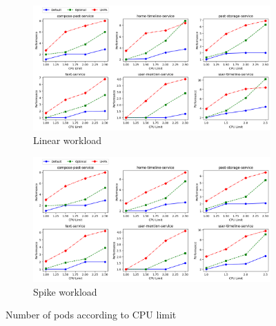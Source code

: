 \documentclass[conference]{IEEEtran}
\begin{document}
\begin{figure}[tb]
    \begin{subfigure}{.48\textwidth}
        \centering
        \includegraphics[width=1\linewidth]{images/evaluation/linear_result.png}
        \caption{Linear workload}
        \label{fig:num of pods linear}
    \end{subfigure}
    \begin{subfigure}{.48\textwidth}
        \centering
        \includegraphics[width=1\linewidth]{images/evaluation/spike_result.png}
        \caption{Spike workload}
        \label{fig:num of pods spike}
    \end{subfigure}

    \caption{Number of pods according to CPU limit}
    \label{fig:num of pods}
\end{figure}
\end{document}
